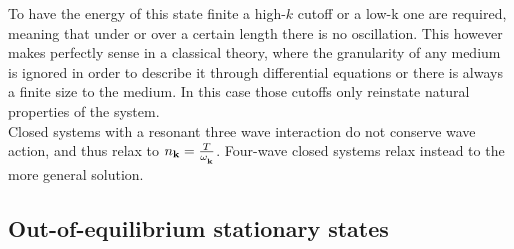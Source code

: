 To have the energy of this state finite a high-$k$ cutoff or a low-k one are required, meaning that under or over a certain length there is no oscillation. This however makes perfectly sense in
a classical theory, where the granularity of any medium is ignored in order to describe it through differential equations or there is always a finite size to the medium. 
In this case those cutoffs only reinstate natural properties of the system.\\ 
Closed systems with a resonant three wave interaction do not conserve wave action, and thus relax to $n_\mathbf{k} = \frac{T}{\omega^{}_{\mathbf{k}}}$. 
Four-wave closed systems relax instead to 
the more general solution. \\

\subsection{Out-of-equilibrium stationary states}

